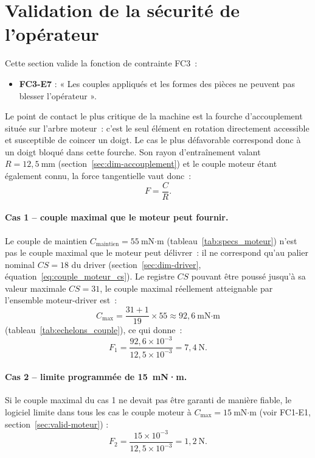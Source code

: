 \section{Validation de la sécurité de l'opérateur}
\label{sec:valid-securite}

Cette section valide la fonction de contrainte FC3~:
\begin{itemize}
    \item \textbf{FC3-E7} : « Les couples appliqués et les formes des pièces
          ne peuvent pas blesser l'opérateur ».
\end{itemize}

Le point de contact le plus critique de la machine est la fourche
d'accouplement située sur l'arbre moteur~: c'est le seul élément en rotation
directement accessible et susceptible de coincer un doigt. Le cas le plus
défavorable correspond donc à un doigt bloqué dans cette fourche. Son rayon
d'entraînement valant $R = 12{,}5\ \text{mm}$ (section~\ref{sec:dim-accouplement}) et le couple moteur étant également connu,
 la force tangentielle vaut donc~:
\[
    F = \frac{C}{R}.
\]

\paragraph{Cas 1 -- couple maximal que le moteur peut fournir.\\}
Le couple de maintien $C_{\text{maintien}} = 55\ \text{mN·m}$
(tableau~\ref{tab:specs_moteur}) n'est pas le couple maximal que le moteur
peut délivrer~: il ne correspond qu'au palier nominal $CS = 18$ du driver
(section~\ref{sec:dim-driver}, équation~\eqref{eq:couple_moteur_cs}).
Le registre $CS$ pouvant être poussé jusqu'à sa valeur maximale $CS = 31$, le
couple maximal réellement atteignable par l'ensemble moteur-driver est~:
\[
    C_{\text{max}} = \frac{31+1}{19} \times 55 \approx 92{,}6\ \text{mN·m}
\]
\noindent (tableau~\ref{tab:echelons_couple}), ce qui donne~:
\[
    F_1 = \frac{92{,}6\times10^{-3}}{12{,}5\times10^{-3}} = 7{,}4\ \text{N}.
\]

\paragraph{Cas 2 -- limite programmée de 15~mN·m.\\}
Si le couple maximal du cas 1 ne devait pas être garanti de manière fiable, le
logiciel limite dans tous les cas le couple moteur à
$C_{\text{max}} = 15\ \text{mN·m}$ (voir FC1-E1, section~\ref{sec:valid-moteur}) :
\[
    F_2 = \frac{15\times10^{-3}}{12{,}5\times10^{-3}} = 1{,}2\ \text{N}.
\]

